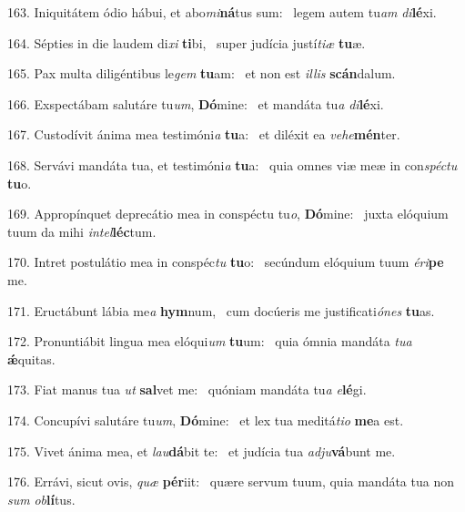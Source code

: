 163. Iniquitátem ódio hábui, et abo\textit{mi}\textbf{ná}tus sum: \ast\  legem autem tu\textit{am} \textit{di}\textbf{lé}xi.\

164. Sépties in die laudem di\textit{xi} \textbf{ti}bi, \ast\  super judícia justí\textit{ti}\textit{æ} \textbf{tu}æ.\

165. Pax multa diligéntibus le\textit{gem} \textbf{tu}am: \ast\  et non est \textit{il}\textit{lis} \textbf{scán}dalum.\

166. Exspectábam salutáre tu\textit{um}, \textbf{Dó}mine: \ast\  et mandáta tu\textit{a} \textit{di}\textbf{lé}xi.\

167. Custodívit ánima mea testimóni\textit{a} \textbf{tu}a: \ast\  et diléxit ea \textit{ve}\textit{he}\textbf{mén}ter.\

168. Servávi mandáta tua, et testimóni\textit{a} \textbf{tu}a: \ast\  quia omnes viæ meæ in con\textit{spéc}\textit{tu} \textbf{tu}o.\

169. Appropínquet deprecátio mea in conspéctu tu\textit{o}, \textbf{Dó}mine: \ast\  juxta elóquium tuum da mihi \textit{in}\textit{tel}\textbf{léc}tum.\

170. Intret postulátio mea in conspéc\textit{tu} \textbf{tu}o: \ast\  secúndum elóquium tuum \textit{é}\textit{ri}\textbf{pe} me.\

171. Eructábunt lábia me\textit{a} \textbf{hym}num, \ast\  cum docúeris me justificati\textit{ó}\textit{nes} \textbf{tu}as.\

172. Pronuntiábit lingua mea elóqui\textit{um} \textbf{tu}um: \ast\  quia ómnia mandáta \textit{tu}\textit{a} \textbf{ǽ}quitas.\

173. Fiat manus tua \textit{ut} \textbf{sal}vet me: \ast\  quóniam mandáta tu\textit{a} \textit{e}\textbf{lé}gi.\

174. Concupívi salutáre tu\textit{um}, \textbf{Dó}mine: \ast\  et lex tua meditá\textit{ti}\textit{o} \textbf{me}a est.\

175. Vivet ánima mea, et \textit{lau}\textbf{dá}bit te: \ast\  et judícia tua \textit{ad}\textit{ju}\textbf{vá}bunt me.\

176. Errávi, sicut ovis, \textit{quæ} \textbf{pér}iit: \ast\  quære servum tuum, quia mandáta tua non \textit{sum} \textit{ob}\textbf{lí}tus.\

